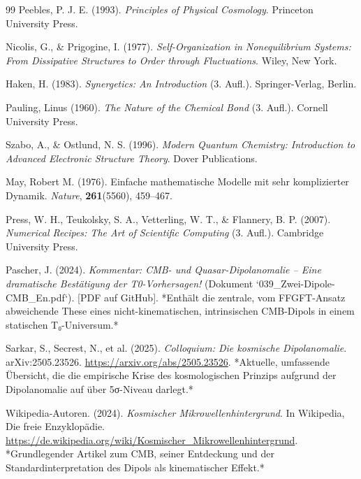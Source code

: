 \begin{thebibliography}{99}
	Peebles, P. J. E. (1993). \textit{Principles of Physical Cosmology}. 
	Princeton University Press.
	
	Nicolis, G., \& Prigogine, I. (1977). \textit{Self-Organization in Nonequilibrium Systems: From Dissipative Structures to Order through Fluctuations}. 
	Wiley, New York.
	
	Haken, H. (1983). \textit{Synergetics: An Introduction} (3. Aufl.). 
	Springer-Verlag, Berlin.
	
	Pauling, Linus (1960). \textit{The Nature of the Chemical Bond} (3. Aufl.). 
	Cornell University Press.
	
	Szabo, A., \& Ostlund, N. S. (1996). \textit{Modern Quantum Chemistry: Introduction to Advanced Electronic Structure Theory}. 
	Dover Publications.
	
	May, Robert M. (1976). Einfache mathematische Modelle mit sehr komplizierter Dynamik. 
	\textit{Nature}, \textbf{261}(5560), 459--467.
	
	Press, W. H., Teukolsky, S. A., Vetterling, W. T., \& Flannery, B. P. (2007). \textit{Numerical Recipes: The Art of Scientific Computing} (3. Aufl.). 
	Cambridge University Press.
	
	Pascher, J. (2024). \textit{Kommentar: CMB- und Quasar-Dipolanomalie – Eine dramatische Bestätigung der T0-Vorhersagen!} (Dokument `039\_Zwei-Dipole-CMB\_En.pdf`).
	[PDF auf GitHub].
	*Enthält die zentrale, vom FFGFT-Ansatz abweichende These eines nicht-kinematischen, intrinsischen CMB-Dipols in einem statischen T₀-Universum.*
	
	Sarkar, S., Secrest, N., et al. (2025). \textit{Colloquium: Die kosmische Dipolanomalie}. 
	arXiv:2505.23526.
	\href{https://arxiv.org/abs/2505.23526}{https://arxiv.org/abs/2505.23526}.
	*Aktuelle, umfassende Übersicht, die die empirische Krise des kosmologischen Prinzips aufgrund der Dipolanomalie auf über 5σ-Niveau darlegt.*
	
	Wikipedia-Autoren. (2024). \textit{Kosmischer Mikrowellenhintergrund}. 
	In Wikipedia, Die freie Enzyklopädie.
	\href{https://de.wikipedia.org/wiki/Kosmischer_Mikrowellenhintergrund}{https://de.wikipedia.org/wiki/Kosmischer\_Mikrowellenhintergrund}.
	*Grundlegender Artikel zum CMB, seiner Entdeckung und der Standardinterpretation des Dipols als kinematischer Effekt.*
	

\end{thebibliography}
